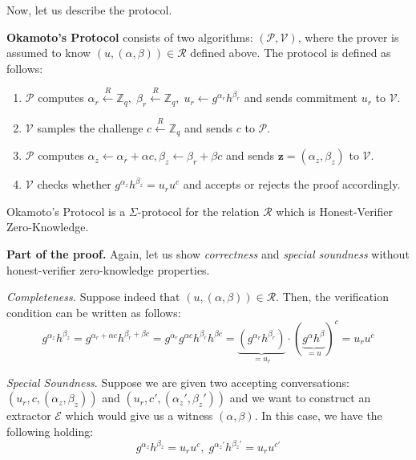 \documentclass[../lecture-notes.tex]{subfiles}
\begin{document}
Now, let us describe the protocol.

\begin{definition}
    \textbf{Okamoto's Protocol} consists of two algorithms: $(\mathcal{P}, \mathcal{V})$, where the prover is assumed to know $(u,(\alpha,\beta)) \in \mathcal{R}$ defined above. The protocol is defined as follows:
    \begin{enumerate}
        \item $\mathcal{P}$ computes $\alpha_r \xleftarrow{R} \mathbb{Z}_q, \; \beta_r \xleftarrow{R} \mathbb{Z}_q, \; u_r \gets g^{\alpha_r}h^{\beta_r}$ and sends commitment $u_r$ to $\mathcal{V}$.
        \item $\mathcal{V}$ samples the challenge $c \xleftarrow{R} \mathbb{Z}_q$ and sends $c$ to $\mathcal{P}$.
        \item $\mathcal{P}$ computes $\alpha_z \gets \alpha_r + \alpha c, \beta_z \gets \beta_r + \beta c$ and sends $\mathbf{z} = (\alpha_z,\beta_z)$ to $\mathcal{V}$.
        \item $\mathcal{V}$ checks whether $g^{\alpha_z}h^{\beta_z} = u_r u^c$ and accepts or rejects the proof accordingly.
    \end{enumerate}
\end{definition}

\begin{theorem}
    Okamoto's Protocol is a $\Sigma$-protocol for the relation $\mathcal{R}$ which is Honest-Verifier Zero-Knowledge.
\end{theorem}

\textbf{Part of the proof.} Again, let us show \textit{correctness} and \textit{special soundness} without honest-verifier zero-knowledge properties.

\textit{Completeness.} Suppose indeed that $(u,(\alpha,\beta)) \in \mathcal{R}$. Then, the verification condition can be written as follows:
\begin{equation*}
    g^{\alpha_z}h^{\beta_z} = g^{\alpha_r + \alpha c}h^{\beta_r + \beta c} = g^{\alpha_r}g^{\alpha c}h^{\beta_r}h^{\beta c} = \underbrace{(g^{\alpha_r}h^{\beta_r})}_{=u_r} \cdot (\underbrace{g^{\alpha}h^{\beta}}_{=u})^c = u_r u^c
\end{equation*}

\textit{Special Soundness}. Suppose we are given two accepting conversations: $(u_r,c,(\alpha_z,\beta_z))$ and $(u_r,c',(\alpha_z',\beta_z'))$ and we want to construct an extractor $\mathcal{E}$ which would give us a witness $(\alpha,\beta)$. In this case, we have the following holding:
\begin{equation*}
    g^{\alpha_z}h^{\beta_z} = u_r u^c, \; g^{\alpha_z'}h^{\beta_z'} = u_r u^{c'}
\end{equation*}
\end{document}

